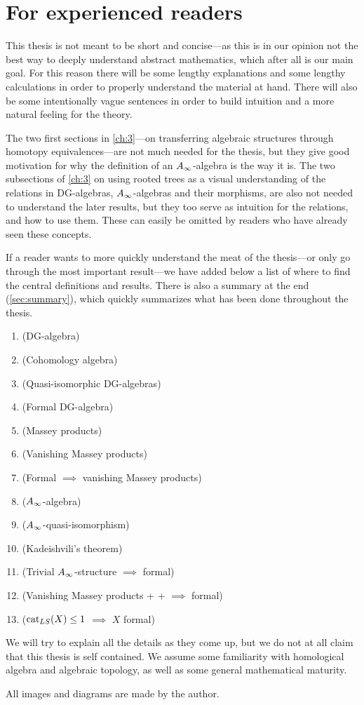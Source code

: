 

\section{For experienced readers}

This thesis is not meant to be short and concise---as this is in our opinion not the best way to deeply understand abstract mathematics, which after all is our main goal. For this reason there will be some lengthy explanations and some lengthy calculations in order to properly understand the material at hand. There will also be some intentionally vague sentences in order to build intuition and a more natural feeling for the theory. 

The two first sections in \cref{ch:3}---on transferring algebraic structures through homotopy equivalences---are not much needed for the thesis, but they give good motivation for why the definition of an $A_{\infty}$-algebra is the way it is. The two subsections of \cref{ch:3} on using rooted trees as a visual understanding of the relations in DG-algebras, $A_{\infty}$-algebras and their morphisms, are also not needed to understand the later results, but they too serve as intuition for the relations, and how to use them. These can easily be omitted by readers who have already seen these concepts. 

If a reader wants to more quickly understand the meat of the thesis---or only go through the most important result---we have added below a list of where to find the central definitions and results. There is also a summary at the end (\cref{sec:summary}), which quickly summarizes what has been done throughout the thesis. 

\begin{enumerate}
	\item {} (DG-algebra)
	\item {} (Cohomology algebra)
	\item {} (Quasi-isomorphic DG-algebras)
	\item {} (Formal DG-algebra)
	\item {} (Massey products)
	\item {} (Vanishing Massey products)
	\item {} (Formal $\implies$ vanishing Massey products)
	\item {} ($A_{\infty}$-algebra)
	\item {} ($A_{\infty}$-quasi-isomorphism)
	\item {} (Kadeishvili's theorem)
	\item {} (Trivial $A_{\infty}$-structure $\implies$ formal)
	\item {} (Vanishing Massey products + + $\implies$ formal)
	\item {} ($\text{cat}_{LS}(X)\leq 1$ $\implies$ $X$ formal)
\end{enumerate}

We will try to explain all the details as they come up, but we do not at all claim that this thesis is self contained. We assume some familiarity with homological algebra and algebraic topology, as well as some general mathematical maturity. 

All images and diagrams are made by the author. 
